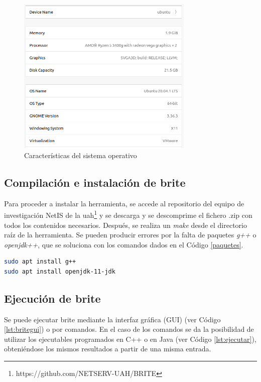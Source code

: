 \begin{figure}[h!]
    \centering
    \includegraphics[width=0.75\textwidth]{img/anexos/ubuntu.PNG}
    \caption{Características del sistema operativo}
    \label{fig:ubuntu}
\end{figure}

\subsection{Compilación e instalación de \gls{brite}}

Para proceder a instalar la herramienta, se accede al repositorio del equipo de investigación NetIS de la \gls{uah}\footnote{https://github.com/NETSERV-UAH/BRITE} y se descarga y se descomprime el fichero .zip con todos los contenidos necesarios. Después, se realiza un \textit{make} desde el directorio raíz de la herramienta. Se pueden producir errores por la falta de paquetes \textit{g++} o \textit{openjdk++}, que se soluciona con los comandos dados en el Código \ref{paquetes}.

\begin{lstlisting}[language=bash, style=Consola, caption={Instalación de paquetes}, label={paquetes}]
sudo apt install g++
sudo apt install openjdk-11-jdk
\end{lstlisting}

\subsection{Ejecución de \gls{brite}}

Se puede ejecutar \gls{brite} mediante la interfaz gráfica (GUI) (ver Código \ref{lst:britegui}) o por comandos. En el caso de los comandos se da la posibilidad de utilizar los ejecutables programados en C++ o en Java (ver Código \ref{lst:ejecutar}), obteniéndose los mismos resultados a partir de una misma entrada.

